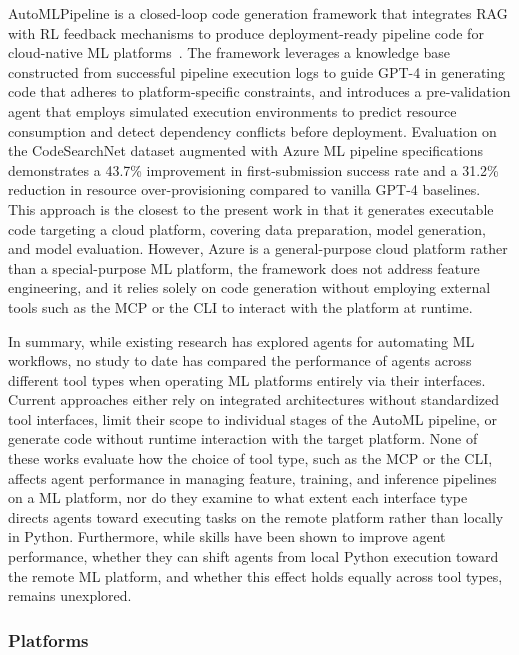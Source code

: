 \documentclass[
english,                 %
bibtex,                  %
includeExtraAbstracts, %
]{kththesis}
\numberwithin{listing}{chapter}
\begin{document}
Auto\gls{ML}Pipeline is a closed-loop code generation framework that integrates \gls{RAG} with \gls{RL} feedback mechanisms to produce deployment-ready pipeline code for cloud-native \gls{ML} platforms~\cite{zhao_automl-pipeline_2026}. The framework leverages a knowledge base constructed from successful pipeline execution logs to guide \gls{GPT}-4 in generating code that adheres to platform-specific constraints, and introduces a pre-validation agent that employs simulated execution environments to predict resource consumption and detect dependency conflicts before deployment. Evaluation on the CodeSearchNet dataset augmented with Azure \gls{ML} pipeline specifications demonstrates a 43.7\% improvement in first-submission success rate and a 31.2\% reduction in resource over-provisioning compared to vanilla \gls{GPT}-4 baselines. This approach is the closest to the present work in that it generates executable code targeting a cloud platform, covering data preparation, model generation, and model evaluation. However, Azure is a general-purpose cloud platform rather than a special-purpose \gls{ML} platform, the framework does not address feature engineering, and it relies solely on code generation without employing external tools such as the \gls{MCP} or the \gls{CLI} to interact with the platform at runtime.

In summary, while existing research has explored agents for automating \gls{ML} workflows, no study to date has compared the performance of agents across different tool types when operating \gls{ML} platforms entirely via their interfaces. Current approaches either rely on integrated architectures without standardized tool interfaces, limit their scope to individual stages of the \gls{AutoML} pipeline, or generate code without runtime interaction with the target platform. None of these works evaluate how the choice of tool type, such as the \gls{MCP} or the \gls{CLI}, affects agent performance in managing feature, training, and inference pipelines on a \gls{ML} platform, nor do they examine to what extent each interface type directs agents toward executing tasks on the remote platform rather than locally in Python. Furthermore, while skills have been shown to improve agent performance, whether they can shift agents from local Python execution toward the remote \gls{ML} platform, and whether this effect holds equally across tool types, remains unexplored.

\subsubsection{Platforms}
\end{document}
